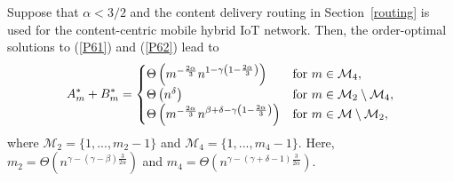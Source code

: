 \documentclass[10pt,journal,compsoc,onecolumn]{IEEEtran}
\begin{document}
\begin{thm} \label{cacheB}
Suppose that $\alpha < 3/2$ and the content delivery routing in
Section~\ref{routing} is used for the content-centric mobile hybrid IoT network. Then, the order-optimal solutions to (\ref{P61}) and
(\ref{P62}) lead to
\begin{equation}
A^{*}_m+B^{*}_m=
  \begin{cases}
    \Theta \left(m^{-\frac{2\alpha}{3}}n^{1-\gamma\left(1-\frac{2\alpha}{3}\right)}\right) & \textnormal{for } m \in \mathcal{M}_4, \\
   \Theta\left(n^\delta \right) & \textnormal{for } m\in\mathcal{M}_2\setminus \mathcal{M}_4, \\
   \Theta\left(m^{-\frac{2\alpha}{3}}n^{\beta+\delta-\gamma\left(1-\frac{2\alpha}{3}\right)}\right) & \textnormal{for } m \in\mathcal{M}\setminus \mathcal{M}_2,
  \end{cases}\nonumber
\end{equation}
where $\mathcal{M}_2 = \lbrace 1,...,m_2-1 \rbrace$ and $\mathcal{M}_4 = \lbrace 1,...,m_4-1 \rbrace$. Here, $m_2=\Theta\left(n^{\gamma-(\gamma-\beta)\frac{3}{2\alpha}}\right)$ and $m_4=\Theta\left(n^{\gamma-(\gamma+\delta-1)\frac{3}{2\alpha}}\right)$.
\end{thm}
\end{document}
